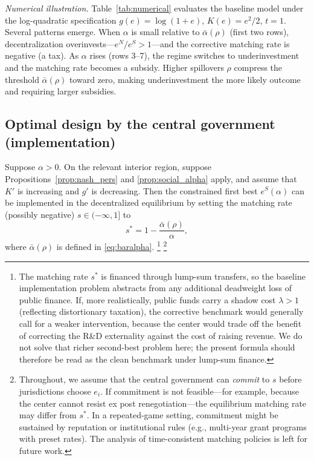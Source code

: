 
\medskip
\noindent\textit{Numerical illustration.}
Table~\ref{tab:numerical} evaluates the baseline model under the log-quadratic specification $g(e)=\log(1+e)$, $K(e)=e^2/2$, $t=1$. Several patterns emerge.
When $\alpha$ is small relative to $\bar\alpha(\rho)$ (first two rows), decentralization overinvests---$e^N/e^S>1$---and the corrective matching rate is negative (a tax).
As $\alpha$ rises (rows 3--7), the regime switches to underinvestment and the matching rate becomes a subsidy. Higher spillovers $\rho$ compress the threshold $\bar\alpha(\rho)$ toward zero, making underinvestment the more likely outcome and requiring larger subsidies.



\subsection{Optimal design by the central government (implementation)}
\begin{proposition}\label{prop:impl}
Suppose $\alpha>0$. On the relevant interior region, suppose Propositions~\ref{prop:nash_pers} and \ref{prop:social_alpha} apply, and assume that $K'$ is increasing and $g'$ is decreasing. Then the constrained first best $e^{S}(\alpha)$ can be implemented in the decentralized equilibrium by setting the matching rate (possibly negative) $s\in(-\infty,1]$ to
\begin{equation}\label{eq:sstar}
  s^{*}=1-\frac{\bar\alpha(\rho)}{\alpha},
\end{equation}
where $\bar\alpha(\rho)$ is defined in \eqref{eq:baralpha}.%
\footnote{The matching rate $s^{*}$ is financed through lump-sum transfers, so the baseline implementation problem abstracts from any additional deadweight loss of public finance. If, more realistically, public funds carry a shadow cost $\lambda>1$ (reflecting distortionary taxation), the corrective benchmark would generally call for a weaker intervention, because the center would trade off the benefit of correcting the R\&D externality against the cost of raising revenue. We do not solve that richer second-best problem here; the present formula should therefore be read as the clean benchmark under lump-sum finance.}%
\footnote{Throughout, we assume that the central government can \emph{commit} to $s$ before jurisdictions choose $e_i$. If commitment is not feasible---for example, because the center cannot resist ex post renegotiation---the equilibrium matching rate may differ from $s^*$.  In a repeated-game setting, commitment might be sustained by reputation or institutional rules (e.g., multi-year grant programs with preset rates).  The analysis of time-consistent matching policies is left for future work.}
\end{proposition}

